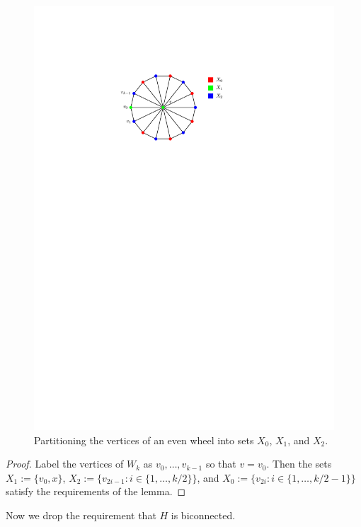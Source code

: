 \documentclass[12pt]{article}
\theoremstyle{definition}
\begin{document}
\begin{figure}
  \centering
  \includegraphics{figs/even_wheel}
  \caption{Partitioning the vertices of an even wheel into sets $X_0$, $X_1$, and $X_2$.}
  \label{even_wheel}
\end{figure}
\begin{proof}
  Label the vertices of $W_k$ as $v_0,\ldots,v_{k-1}$ so that $v=v_0$.  Then the sets $X_1:=\{v_0, x\}$, $X_2:=\{v_{2i-1}:i\in\{1,\ldots,k/2\}\}$, and $X_0:=\{v_{2i}:i\in\{1,\ldots, k/2-1\}\}$ satisfy the requirements of the lemma.
\end{proof}


Now we drop the requirement that $H$ is biconnected.
\end{document}

